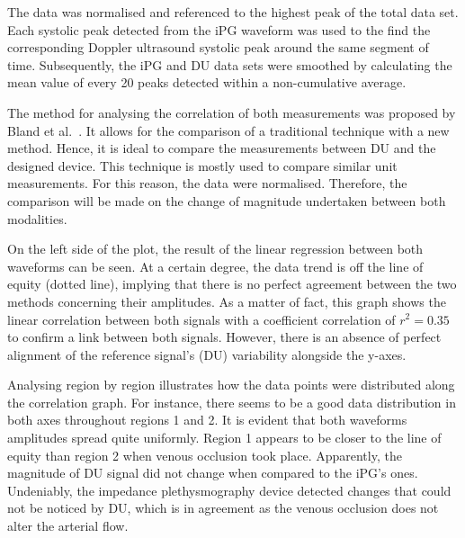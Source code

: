 The data was normalised and referenced to the highest peak of the total data set.  Each systolic peak detected from the iPG waveform was used to the find the corresponding Doppler ultrasound systolic peak around the same segment of time. Subsequently, the iPG and DU data sets were smoothed by calculating the mean value of every 20 peaks detected within a non-cumulative average.  

The method for analysing the correlation of both measurements was proposed by Bland et al.~\cite{bland1986statistical}. It allows for the comparison of a traditional technique with a new method. Hence, it is ideal to compare the measurements between DU and the designed device. This technique is mostly used to compare similar unit measurements. For this reason, the data were normalised. Therefore, the comparison will be made on the change of magnitude undertaken between both modalities.

On the left side of the plot, the result of the linear regression between both waveforms can be seen. At a certain degree, the data trend is off the line of equity (dotted line), implying that there is no perfect agreement between the two methods concerning their amplitudes. As a matter of fact, this graph shows the linear correlation between both signals with a coefficient correlation of $r^2 = 0.35$ to confirm a link between both signals. However, there is an absence of perfect alignment of the reference signal's (DU) variability alongside the y-axes. 

Analysing region by region illustrates how the data points were distributed along the correlation graph. For instance, there seems to be a good data distribution in both axes throughout regions 1 and 2. It is evident that both waveforms amplitudes spread quite uniformly. Region 1 appears to be closer to the line of equity than region 2 when venous occlusion took place. Apparently, the magnitude of DU signal did not change when compared to the iPG's ones. Undeniably, the impedance plethysmography device detected changes that could not be noticed by DU, which is in agreement as the venous occlusion does not alter the arterial flow. 


